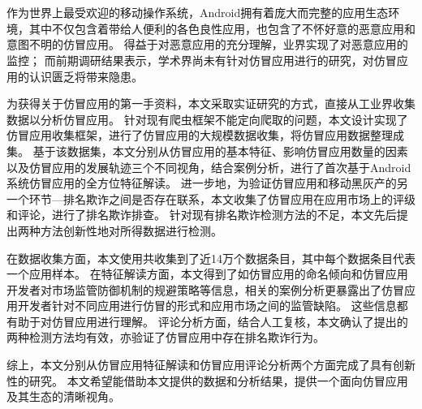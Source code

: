 \cleardoublepage{}

\chapter*{}
\vspace{-5mm}

\setlength{\baselineskip}{25pt} %

作为世界上最受欢迎的移动操作系统，Android拥有着庞大而完整的应用生态环境，其中不仅包含着带给人便利的各色良性应用，也包含了不怀好意的恶意应用和意图不明的仿冒应用。
得益于对恶意应用的充分理解，业界实现了对恶意应用的监控；
而前期调研结果表示，学术界尚未有针对仿冒应用进行的研究，对仿冒应用的认识匮乏将带来隐患。

为获得关于仿冒应用的第一手资料，本文采取实证研究的方式，直接从工业界收集数据以分析仿冒应用。
针对现有爬虫框架不能定向爬取的问题，本文设计实现了仿冒应用收集框架\mytool ，进行了仿冒应用的大规模数据收集，将仿冒应用数据整理成集。
基于该数据集，本文分别从仿冒应用的基本特征、影响仿冒应用数量的因素以及仿冒应用的发展轨迹三个不同视角，结合案例分析，进行了首次基于Android系统仿冒应用的全方位特征解读。
进一步地，为验证仿冒应用和移动黑灰产的另一个环节---排名欺诈之间是否存在联系，本文收集了仿冒应用在应用市场上的评级和评论，进行了排名欺诈排查。
针对现有排名欺诈检测方法的不足，本文先后提出两种方法创新性地对所得数据进行检测。

在数据收集方面，本文使用\mytool 共收集到了近14万个数据条目，其中每个数据条目代表一个应用样本。
在特征解读方面，本文得到了如仿冒应用的命名倾向和仿冒应用开发者对市场监管防御机制的规避策略等信息，相关的案例分析更暴露出了仿冒应用开发者针对不同应用进行仿冒的形式和应用市场之间的监管缺陷。
这些信息都有助于对仿冒应用进行理解。
评论分析方面，结合人工复核，本文确认了提出的两种检测方法均有效，亦验证了仿冒应用中存在排名欺诈行为。

综上，本文分别从仿冒应用特征解读和仿冒应用评论分析两个方面完成了具有创新性的研究。
本文希望能借助本文提供的数据和分析结果，提供一个面向仿冒应用及其生态的清晰视角。

 
